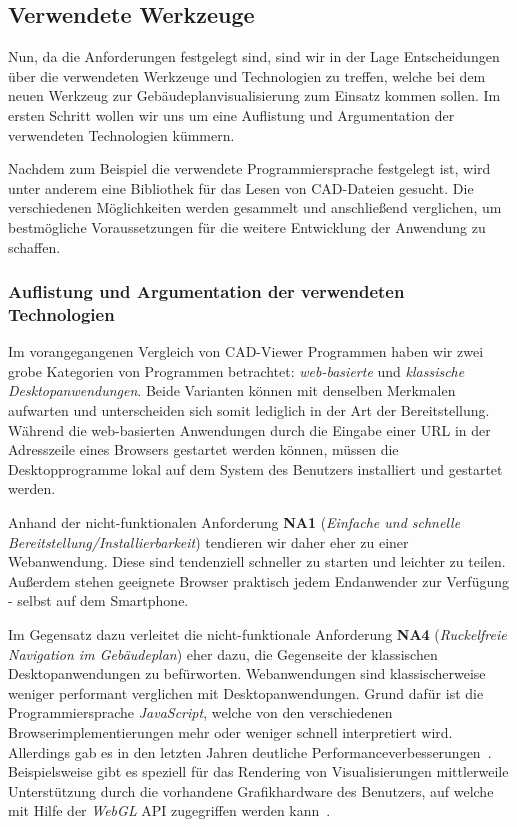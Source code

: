 \subsection{Verwendete Werkzeuge}
\label{subsec:used-tools}

Nun, da die Anforderungen festgelegt sind, sind wir in der Lage Entscheidungen über die verwendeten Werkzeuge und Technologien zu treffen, welche bei dem neuen Werkzeug zur Gebäudeplanvisualisierung zum Einsatz kommen sollen.
Im ersten Schritt wollen wir uns um eine Auflistung und Argumentation der verwendeten Technologien kümmern.

Nachdem zum Beispiel die verwendete Programmiersprache festgelegt ist, wird unter anderem eine Bibliothek für das Lesen von CAD-Dateien gesucht.
Die verschiedenen Möglichkeiten werden gesammelt und anschließend verglichen, um bestmögliche Voraussetzungen für die weitere Entwicklung der Anwendung zu schaffen.

\subsubsection{Auflistung und Argumentation der verwendeten Technologien}
\label{subsec:collection-tools}

Im vorangegangenen Vergleich von CAD-Viewer Programmen haben wir zwei grobe Kategorien von Programmen betrachtet: \textit{web-basierte} und \textit{klassische Desktopanwendungen}.
Beide Varianten können mit denselben Merkmalen aufwarten und unterscheiden sich somit lediglich in der Art der Bereitstellung.
Während die web-basierten Anwendungen durch die Eingabe einer URL in der Adresszeile eines Browsers gestartet werden können, müssen die Desktopprogramme lokal auf dem System des Benutzers installiert und gestartet werden.

Anhand der nicht-funktionalen Anforderung \textbf{NA1} (\textit{Einfache und schnelle Bereitstellung/Installierbarkeit}) tendieren wir daher eher zu einer Webanwendung.
Diese sind tendenziell schneller zu starten und leichter zu teilen.
Außerdem stehen geeignete Browser praktisch jedem Endanwender zur Verfügung - selbst auf dem Smartphone.

Im Gegensatz dazu verleitet die nicht-funktionale Anforderung \textbf{NA4} (\textit{Ruckelfreie Navigation im Gebäudeplan}) eher dazu, die Gegenseite der klassischen Desktopanwendungen zu befürworten.
Webanwendungen sind klassischerweise weniger performant verglichen mit Desktopanwendungen.
Grund dafür ist die Programmiersprache \textit{JavaScript}, welche von den verschiedenen Browserimplementierungen mehr oder weniger schnell interpretiert wird.
Allerdings gab es in den letzten Jahren deutliche Performanceverbesserungen~\cite{WebAppMolecular}.
Beispielsweise gibt es speziell für das Rendering von Visualisierungen mittlerweile Unterstützung durch die vorhandene Grafikhardware des Benutzers, auf welche mit Hilfe der \textit{WebGL} API zugegriffen werden kann~\cite{WebAppMolecular}.

